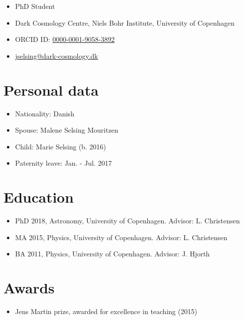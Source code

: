 \documentclass[12pt,letterpaper]{article}
\begin{document}
\thispagestyle{empty}\sloppy\sloppypar

{\huge \name}
\vspace{-0.25em}

\begin{itemize}
  \item PhD Student
  \item Dark Cosmology Centre, Niels Bohr Institute, University of Copenhagen
  \item  ORCID ID: \href{https://orcid.org/0000-0001-9058-3892}{0000-0001-9058-3892}
  \item \href{mailto:jselsing@dark-cosmology.dk}{jselsing@dark-cosmology.dk} 
\end{itemize}


\section*{Personal data}

\begin{itemize}
	\item Nationality: Danish
	\item Spouse: Malene Selsing Mouritzen
	\item Child: Marie Selsing (b. 2016) 
	\item Paternity leave: Jan. - Jul. 2017
	
\end{itemize}


\section*{Education}
	\begin{itemize}
	\item PhD 2018, Astronomy, University of Copenhagen.
		{Advisor: L. Christensen}
	\item MA 2015, Physics, University of Copenhagen.
		{Advisor: L. Christensen}
	\item BA 2011, Physics, University of Copenhagen.
		{Advisor: J. Hjorth}
	\end{itemize}


\section*{Awards}

	\begin{itemize}
    \item Jens Martin prize, awarded for excellence in teaching (2015)
	\end{itemize}
\end{document}
